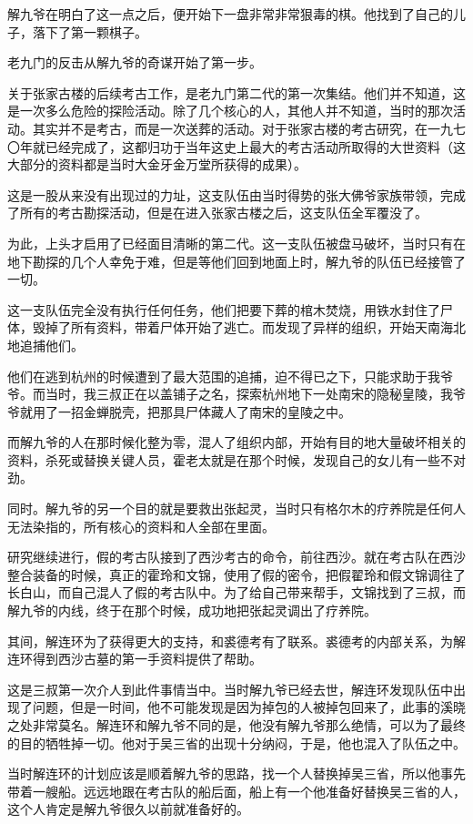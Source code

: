 解九爷在明白了这一点之后，便开始下一盘非常非常狠毒的棋。他找到了自己的儿子，落下了第一颗棋子。

老九门的反击从解九爷的奇谋开始了第一步。

关于张家古楼的后续考古工作，是老九门第二代的第一次集结。他们并不知道，这是一次多么危险的探险活动。除了几个核心的人，其他人并不知道，当时的那次活动。其实并不是考古，而是一次送葬的活动。对于张家古楼的考古研究，在一九七〇年就已经完成了，这都归功于当年这史上最大的考古活动所取得的大世资料（这大部分的资料都是当时大金牙金万堂所获得的成果）。

这是一股从来没有出现过的力址，这支队伍由当时得势的张大佛爷家族带领，完成了所有的考古勘探活动，但是在进入张家古楼之后，这支队伍全军覆没了。

为此，上头才启用了已经面目清晰的第二代。这一支队伍被盘马破坏，当时只有在地下勘探的几个人幸免于难，但是等他们回到地面上时，解九爷的队伍已经接管了一切。

这一支队伍完全没有执行任何任务，他们把要下葬的棺木焚烧，用铁水封住了尸体，毁掉了所有资料，带着尸体开始了逃亡。而发现了异样的组织，开始天南海北地追捕他们。

他们在逃到杭州的时候遭到了最大范围的追捕，迫不得已之下，只能求助于我爷爷。而当时，我三叔正在以盖铺子之名，探索杭州地下一处南宋的隐秘皇陵，我爷爷就用了一招金蝉脱壳，把那具尸体藏人了南宋的皇陵之中。

而解九爷的人在那时候化整为零，混人了组织内部，开始有目的地大量破坏相关的资料，杀死或替换关键人员，霍老太就是在那个时候，发现自己的女儿有一些不对劲。

同时。解九爷的另一个目的就是要救出张起灵，当时只有格尔木的疗养院是任何人无法染指的，所有核心的资料和人全部在里面。

研究继续进行，假的考古队接到了西沙考古的命令，前往西沙。就在考古队在西沙整合装备的时候，真正的霍玲和文锦，使用了假的密令，把假翟玲和假文锦调往了长白山，而自己混人了假的考古队中。为了给自己带来帮手，文锦找到了三叔，而解九爷的内线，终于在那个时候，成功地把张起灵调出了疗养院。

其间，解连环为了获得更大的支持，和裘德考有了联系。裘德考的内部关系，为解连环得到西沙古墓的第一手资料提供了帮助。

这是三叔第一次介人到此件事情当中。当时解九爷已经去世，解连环发现队伍中出现了问题，但是一时间，他不可能发现是因为掉包的人被掉包回来了，此事的溪晓之处非常莫名。解连环和解九爷不同的是，他没有解九爷那么绝情，可以为了最终的目的牺牲掉一切。他对于吴三省的出现十分纳闷，于是，他也混入了队伍之中。

当时解连环的计划应该是顺着解九爷的思路，找一个人替换掉吴三省，所以他事先带着一艘船。远远地跟在考古队的船后面，船上有一个他准备好替换吴三省的人，这个人肯定是解九爷很久以前就准备好的。

